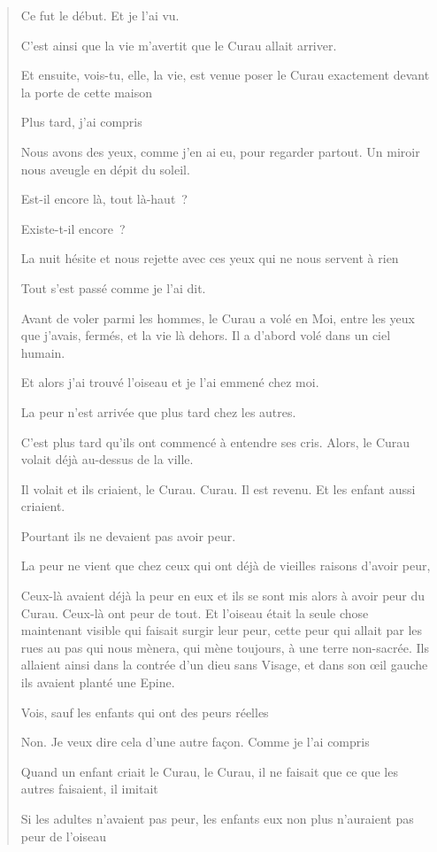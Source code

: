 \begin{quote}
Ce fut le début. Et je l'ai vu.

C'est ainsi que la vie m'avertit que le Curau allait arriver.

Et ensuite, vois-tu, elle, la vie, est venue poser le Curau exactement
devant la porte de cette maison

Plus tard, j'ai compris

Nous avons des yeux, comme j'en ai eu, pour regarder partout. Un miroir
nous aveugle en dépit du soleil.

Est-il encore là, tout là-haut~?

Existe-t-il encore~?

La nuit hésite et nous rejette avec ces yeux qui ne nous servent à rien

Tout s'est passé comme je l'ai dit.

Avant de voler parmi les hommes, le Curau a volé en Moi, entre les yeux
que j'avais, fermés, et la vie là dehors. Il a d'abord volé dans un ciel
humain.

Et alors j'ai trouvé l'oiseau et je l'ai emmené chez moi.

La peur n'est arrivée que plus tard chez les autres.

C'est plus tard qu'ils ont commencé à entendre ses cris. Alors, le Curau
volait déjà au-dessus de la ville.

Il volait et ils criaient, le Curau. Curau. Il est revenu. Et les enfant
aussi criaient.

Pourtant ils ne devaient pas avoir peur.

La peur ne vient que chez ceux qui ont déjà de vieilles raisons d'avoir
peur,

Ceux-là avaient déjà la peur en eux et ils se sont mis alors à avoir
peur du Curau. Ceux-là ont peur de tout. Et l'oiseau était la seule
chose maintenant visible qui faisait surgir leur peur, cette peur qui
allait par les rues au pas qui nous mènera, qui mène toujours, à une
terre non-sacrée. Ils allaient ainsi dans la contrée d'un dieu sans
Visage, et dans son œil gauche ils avaient planté une Epine.

Vois, sauf les enfants qui ont des peurs réelles

Non. Je veux dire cela d'une autre façon. Comme je l'ai compris

Quand un enfant criait le Curau, le Curau, il ne faisait que ce que les
autres faisaient, il imitait

Si les adultes n'avaient pas peur, les enfants eux non plus n'auraient
pas peur de l'oiseau


\end{quote}

